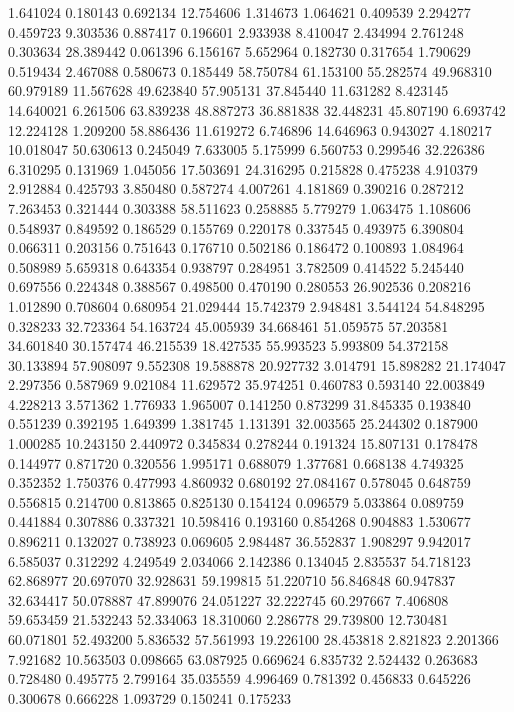 1.641024
0.180143
0.692134
12.754606
1.314673
1.064621
0.409539
2.294277
0.459723
9.303536
0.887417
0.196601
2.933938
8.410047
2.434994
2.761248
0.303634
28.389442
0.061396
6.156167
5.652964
0.182730
0.317654
1.790629
0.519434
2.467088
0.580673
0.185449
58.750784
61.153100
55.282574
49.968310
60.979189
11.567628
49.623840
57.905131
37.845440
11.631282
8.423145
14.640021
6.261506
63.839238
48.887273
36.881838
32.448231
45.807190
6.693742
12.224128
1.209200
58.886436
11.619272
6.746896
14.646963
0.943027
4.180217
10.018047
50.630613
0.245049
7.633005
5.175999
6.560753
0.299546
32.226386
6.310295
0.131969
1.045056
17.503691
24.316295
0.215828
0.475238
4.910379
2.912884
0.425793
3.850480
0.587274
4.007261
4.181869
0.390216
0.287212
7.263453
0.321444
0.303388
58.511623
0.258885
5.779279
1.063475
1.108606
0.548937
0.849592
0.186529
0.155769
0.220178
0.337545
0.493975
6.390804
0.066311
0.203156
0.751643
0.176710
0.502186
0.186472
0.100893
1.084964
0.508989
5.659318
0.643354
0.938797
0.284951
3.782509
0.414522
5.245440
0.697556
0.224348
0.388567
0.498500
0.470190
0.280553
26.902536
0.208216
1.012890
0.708604
0.680954
21.029444
15.742379
2.948481
3.544124
54.848295
0.328233
32.723364
54.163724
45.005939
34.668461
51.059575
57.203581
34.601840
30.157474
46.215539
18.427535
55.993523
5.993809
54.372158
30.133894
57.908097
9.552308
19.588878
20.927732
3.014791
15.898282
21.174047
2.297356
0.587969
9.021084
11.629572
35.974251
0.460783
0.593140
22.003849
4.228213
3.571362
1.776933
1.965007
0.141250
0.873299
31.845335
0.193840
0.551239
0.392195
1.649399
1.381745
1.131391
32.003565
25.244302
0.187900
1.000285
10.243150
2.440972
0.345834
0.278244
0.191324
15.807131
0.178478
0.144977
0.871720
0.320556
1.995171
0.688079
1.377681
0.668138
4.749325
0.352352
1.750376
0.477993
4.860932
0.680192
27.084167
0.578045
0.648759
0.556815
0.214700
0.813865
0.825130
0.154124
0.096579
5.033864
0.089759
0.441884
0.307886
0.337321
10.598416
0.193160
0.854268
0.904883
1.530677
0.896211
0.132027
0.738923
0.069605
2.984487
36.552837
1.908297
9.942017
6.585037
0.312292
4.249549
2.034066
2.142386
0.134045
2.835537
54.718123
62.868977
20.697070
32.928631
59.199815
51.220710
56.846848
60.947837
32.634417
50.078887
47.899076
24.051227
32.222745
60.297667
7.406808
59.653459
21.532243
52.334063
18.310060
2.286778
29.739800
12.730481
60.071801
52.493200
5.836532
57.561993
19.226100
28.453818
2.821823
2.201366
7.921682
10.563503
0.098665
63.087925
0.669624
6.835732
2.524432
0.263683
0.728480
0.495775
2.799164
35.035559
4.996469
0.781392
0.456833
0.645226
0.300678
0.666228
1.093729
0.150241
0.175233
